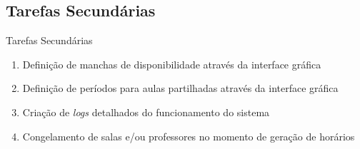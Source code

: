 \documentclass[11]{beamer}
\begin{document}
    \subsection{Tarefas Secundárias}

    \begin{frame}{Tarefas Secundárias}
        \justifying
        \begin{enumerate}
            \item Definição de manchas de disponibilidade através da interface gráfica
            \item Definição de períodos para aulas partilhadas através da interface gráfica
            \item Criação de \textit{logs} detalhados do funcionamento do sistema
            \item Congelamento de salas e/ou professores no momento de geração de horários
        \end{enumerate}
    \end{frame}

\end{document}
